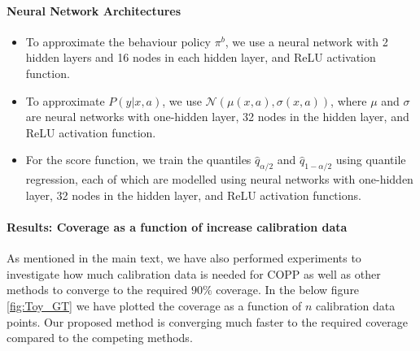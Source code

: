 \paragraph{Neural Network Architectures}
\begin{itemize}
    \item To approximate the behaviour policy $\pi^b$, we use a neural network with 2 hidden layers and 16 nodes in each hidden layer, and ReLU activation function.
    \item To approximate $P(y|x, a)$, we use $\mathcal{N}(\mu(x, a), \sigma(x, a))$, where $\mu$ and $\sigma$ are neural networks with one-hidden layer, 32 nodes in the hidden layer, and ReLU activation function.
    \item For the score function, we train the quantiles $\hat{q}_{\alpha/2}$ and $\hat{q}_{1 - \alpha/2}$ using quantile regression, each of which are modelled using neural networks with one-hidden layer, 32 nodes in the hidden layer, and ReLU activation functions.
\end{itemize}

\paragraph{Results: Coverage as a function of increase calibration data}\label{app:N-cal_exp_toy}
As mentioned in the main text, we have also performed experiments to investigate how much calibration data is needed for COPP as well as other methods to converge to the required $90\%$ coverage. In the below figure \ref{fig:Toy_GT} we have plotted the coverage as a function of $n$ calibration data points. Our proposed method is converging much faster to the required coverage compared to the competing methods.

